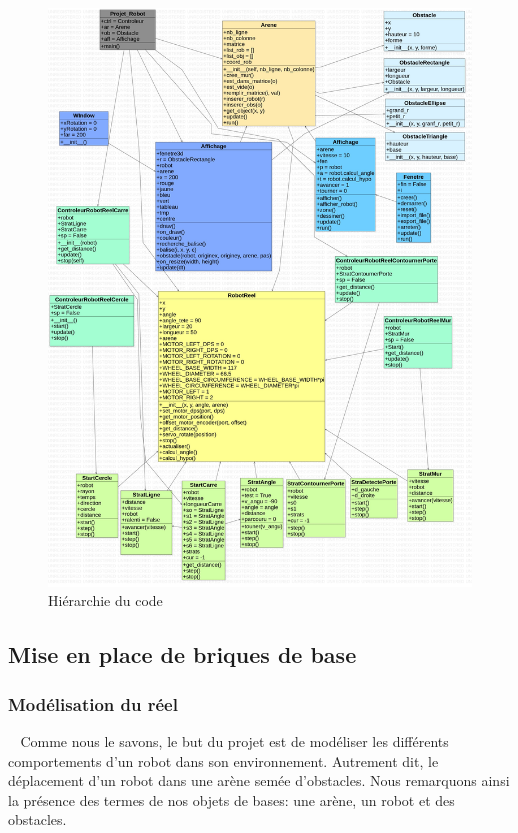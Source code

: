 \documentclass[12pt]{article}
\def\tab{$\>\>\>\>$}
\begin{document}
\begin{figure}[!h]
  \centering
    \includegraphics[width=0.80\paperwidth]{Images/ProjetRobotique6.jpg}
  \caption{Hiérarchie du code}
  \label{img:Images/ProjetRobotique6.jpg}
\end{figure}

\subsection{Mise en place de briques de base}
\subsubsection{Modélisation du réel}
\tab Comme nous le savons, le but du projet est de modéliser les différents comportements d’un robot dans son environnement. Autrement dit, le déplacement d’un robot dans une arène semée d’obstacles. Nous remarquons ainsi la présence des termes de nos objets de bases: une arène, un robot et des obstacles.
\end{document}
